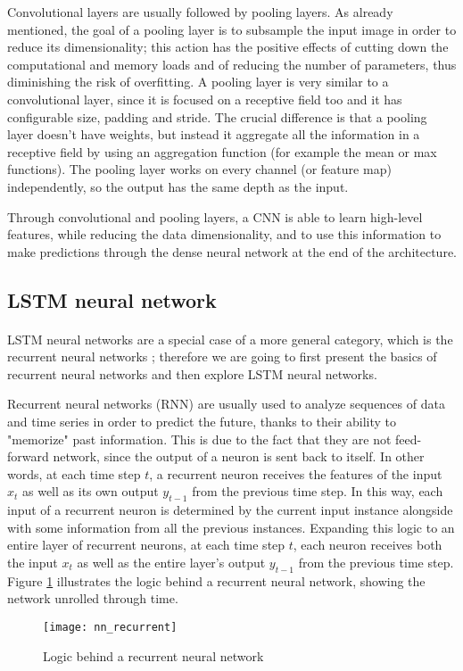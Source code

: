Convolutional layers are usually followed by pooling layers. As already mentioned, the goal of a pooling layer is to subsample the input image in order to reduce its dimensionality; this action has the positive effects of cutting down the computational and memory loads and of reducing the number of parameters, thus diminishing the risk of overfitting. A pooling layer is very similar to a convolutional layer, since it is focused on a receptive field too and it has configurable size, padding and stride. The crucial difference is that a pooling layer doesn't have weights, but instead it aggregate all the information in a receptive field by using an aggregation function (for example the mean or max functions). The pooling layer works on every channel (or feature map) independently, so the output has the same depth as the input.

Through convolutional and pooling layers, a CNN is able to learn high-level features, while reducing the data dimensionality, and to use this information to make predictions through the dense neural network at the end of the architecture.

\subsection{LSTM neural network}
\paragraph{} LSTM neural networks are a special case of a more general category, which is the recurrent neural networks \cite{OReilly:handsonML}; therefore we are going to first present the basics of recurrent neural networks and then explore LSTM neural networks.

Recurrent neural networks (RNN) are usually used to analyze sequences of data and time series in order to predict the future, thanks to their ability to "memorize" past information. This is due to the fact that they are not feed-forward network, since the output of a neuron is sent back to itself. In other words, at each time step $t$, a recurrent neuron receives the features of the input $x_t$ as well as its own output $y_{t-1}$ from the previous time step. In this way, each input of a recurrent neuron is determined by the current input instance alongside with some information from all the previous instances. Expanding this logic to an entire layer of recurrent neurons, at each time step $t$, each neuron receives both the input $x_t$ as well as the entire layer's output $y_{t-1}$ from the previous time step. Figure \ref{fig:nn_recurrent} illustrates the logic behind a recurrent neural network, showing the network unrolled through time.
\begin{figure}[t]
    \centering
    \texttt{[image: nn\_recurrent]}
    \caption{Logic behind a recurrent neural network}
    \label{fig:nn_recurrent}
\end{figure}


